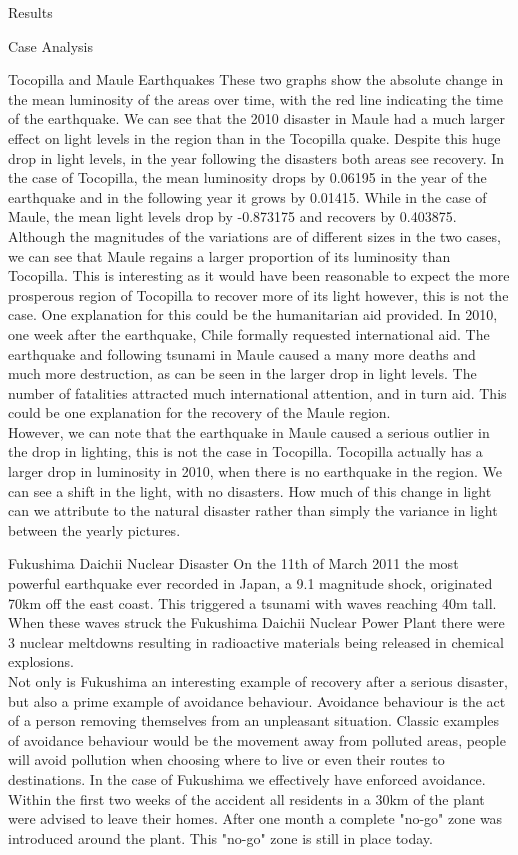 \documentclass[12pt,fleqn,leqno,letterpaper]{article}
\begin{document}
\begin{section}{Results}
\begin{subsection}{Case Analysis}
\begin{subsubsection}{Tocopilla and Maule Earthquakes}
			These two graphs show the absolute change in the mean luminosity of the areas over time, with the red line indicating the time of the earthquake. We can see that the 2010 disaster in Maule had a much larger effect on light levels in the region than in the Tocopilla quake. Despite this huge drop in light levels, in the year following the disasters both areas see recovery. In the case of Tocopilla, the mean luminosity drops by 0.06195 in the year of the earthquake and in the following year it grows by 0.01415. While in the case of Maule, the mean light levels drop by -0.873175 and recovers by 0.403875. Although the magnitudes of the variations are of different sizes in the two cases, we can see that Maule regains a larger proportion of its luminosity than Tocopilla. This is interesting as it would have been reasonable to expect the more prosperous region of Tocopilla to recover more of its light however, this is not the case. One explanation for this could be the humanitarian aid provided. In 2010, one week after the earthquake, Chile formally requested international aid. The earthquake and following tsunami in Maule caused a many more deaths and much more destruction, as can be seen in the larger drop in light levels. The number of fatalities attracted much international attention, and in turn aid. This could be one explanation for the recovery of the Maule region. \\
			However, we can note that the earthquake in Maule caused a serious outlier in the drop in lighting, this is not the case in Tocopilla. Tocopilla actually has a larger drop in luminosity in 2010, when there is no earthquake in the region. We can see a shift in the light, with no disasters. How much of this change in light can we attribute to the natural disaster rather than simply the variance in light between the yearly pictures.
		\end{subsubsection}
	  \begin{subsubsection}{Fukushima Daichii Nuclear Disaster}
			On the 11th of March 2011 the most powerful earthquake ever recorded in Japan, a 9.1 magnitude shock, originated 70km off the east coast. This triggered a tsunami with waves reaching 40m tall. When these waves struck the Fukushima Daichii Nuclear Power Plant there were 3 nuclear meltdowns resulting in radioactive materials being released in chemical explosions. \\
			Not only is Fukushima an interesting example of recovery after a serious disaster, but also a prime example of avoidance behaviour. Avoidance behaviour is the act of a person removing themselves from an unpleasant situation. Classic examples of avoidance behaviour would be the movement away from polluted areas, people will avoid pollution when choosing where to live or even their routes to destinations. In the case of Fukushima we effectively have enforced avoidance. Within the first two weeks of the accident all residents in a 30km of the plant were advised to leave their homes. After one month a complete "no-go" zone was introduced around the plant. This "no-go" zone is still in place today. \\

\end{subsubsection}
\end{subsection}
\end{section}
\end{document}
